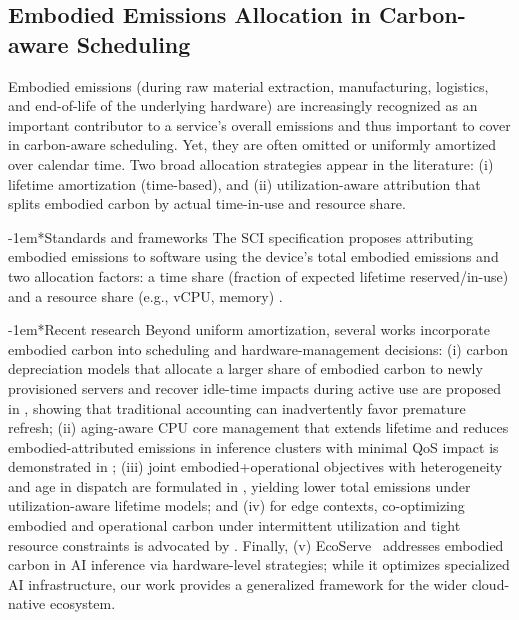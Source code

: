 \documentclass[10pt,journal,compsoc]{IEEEtran}
\makeatletter
\renewcommand{\paragraph}{\@startsection{paragraph}{4}{0pt}{1.5ex plus 1.5ex minus 0.5ex}%
{-1em}{\normalfont\normalsize\bfseries}}
\makeatother
\begin{document}
\subsection{Embodied Emissions Allocation in Carbon-aware Scheduling}\label{s:emb-alloc}
Embodied emissions (during raw material extraction, manufacturing, logistics, and end-of-life of the underlying hardware) are increasingly recognized as an important contributor to a service's overall emissions and thus important to cover in carbon-aware scheduling. Yet, they are often omitted or uniformly amortized over calendar time. Two broad allocation strategies appear in the literature: (i) lifetime amortization (time-based), and (ii) utilization-aware attribution that splits embodied carbon by actual time-in-use and resource share.

\paragraph*{Standards and frameworks} The SCI specification proposes attributing embodied emissions to software using the device's total embodied emissions and two allocation factors: a time share (fraction of expected lifetime reserved/in-use) and a resource share (e.g., vCPU, memory) \cite{gsf2024}.

\paragraph*{Recent research} Beyond uniform amortization, several works incorporate embodied carbon into scheduling and hardware-management decisions: (i) carbon depreciation models that allocate a larger share of embodied carbon to newly provisioned servers and recover idle-time impacts during active use are proposed in \cite{ji2025}, showing that traditional accounting can inadvertently favor premature refresh; (ii) aging-aware CPU core management that extends lifetime and reduces embodied-attributed emissions in inference clusters with minimal QoS impact is demonstrated in \cite{hewage2025}; (iii) joint embodied+operational objectives with heterogeneity and age in dispatch are formulated in \cite{zhang2025}, yielding lower total emissions under utilization-aware lifetime models; and (iv) for edge contexts, co-optimizing embodied and operational carbon under intermittent utilization and tight resource constraints is advocated by \cite{panteleaki2025}. Finally, (v) EcoServe~\cite{Li2025EcoServe} addresses embodied carbon in AI inference via hardware-level strategies; while it optimizes specialized AI infrastructure, our work provides a generalized framework for the wider cloud-native ecosystem.
\end{document}
